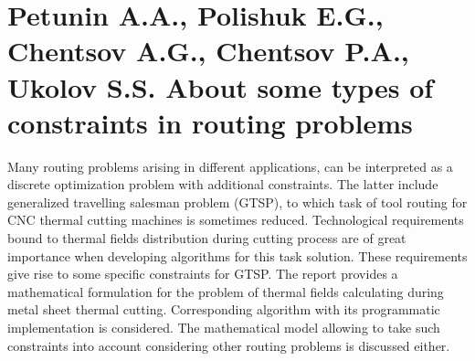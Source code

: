 \section*{Petunin A.A., Polishuk E.G., Chentsov A.G., Chentsov P.A., Ukolov S.S.
About some types of constraints in routing problems}

Many routing problems arising in different applications,
can be interpreted as a discrete optimization problem with additional constraints.
The latter include generalized travelling salesman problem (GTSP),
to which task of tool routing for CNC thermal cutting machines
is sometimes reduced.
Technological requirements bound to thermal fields distribution
during cutting process are of great importance
when developing algorithms for this task solution.
These requirements give rise to some specific constraints for GTSP.
The report provides a mathematical formulation
for the problem of thermal fields calculating
during metal sheet thermal cutting.
Corresponding algorithm with its programmatic implementation is considered.
The mathematical model allowing to take such constraints into account
considering other routing problems is discussed either.
